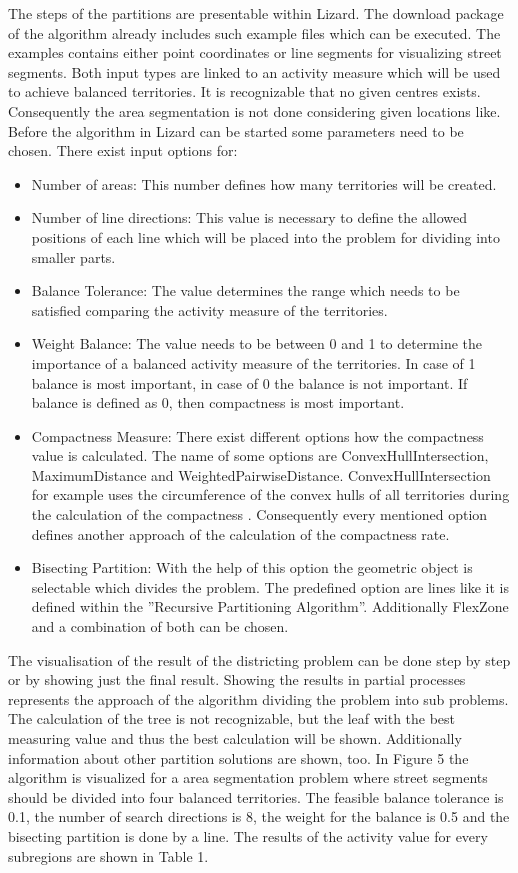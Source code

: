 \newpage
The steps of the partitions are presentable within Lizard. The download package of the algorithm already includes such example files which can be executed. The examples contains either point coordinates or line segments for visualizing street segments. Both input types are linked to an activity measure which will be used to achieve balanced territories. It is recognizable that no given centres exists. Consequently the area segmentation is not done considering given locations like. Before the algorithm in Lizard can be started some parameters need to be chosen. There exist input options for:
\begin{itemize}
	\item Number of areas: This number defines how many territories will be created.
	\item Number of line directions: This value is necessary to define the allowed positions of each line which will be placed into the problem for dividing into smaller parts.
	\item Balance Tolerance: The value determines the range which needs to be satisfied comparing the activity measure of the territories.
	\item Weight Balance: The value needs to be between 0 and 1 to determine the importance of a balanced activity measure of the territories. In case of 1 balance is most important, in case of 0 the balance is not important. If balance is defined as 0, then compactness is most important.
	\item Compactness Measure: There exist different options how the compactness value is calculated. The name of some options are ConvexHullIntersection, MaximumDistance and WeightedPairwiseDistance. ConvexHullIntersection for example uses the circumference of the convex hulls of all territories during the calculation of the compactness \cite{kit_lizard}. Consequently every mentioned option defines another approach of the calculation of the compactness rate.
	\item Bisecting Partition: With the help of this option the geometric object is selectable which divides the problem. The predefined option are lines like it is defined within the ''Recursive Partitioning Algorithm''. Additionally FlexZone and a combination of both can be chosen.
\end{itemize}

The visualisation of the result of the districting problem can be done step by step or by showing just the final result. Showing the results in partial processes represents the approach of the algorithm dividing the problem into sub problems. The calculation of the tree is not recognizable, but the leaf with the best measuring value and thus the best calculation will be shown. Additionally information about other partition solutions are shown, too. In Figure 5 the algorithm is visualized for a area segmentation problem where street segments should be divided into four balanced territories. The feasible balance tolerance is 0.1, the number of search directions is 8, the weight for the balance is 0.5 and the bisecting partition is done by a line. The results of the activity value for every subregions are shown in Table 1.

